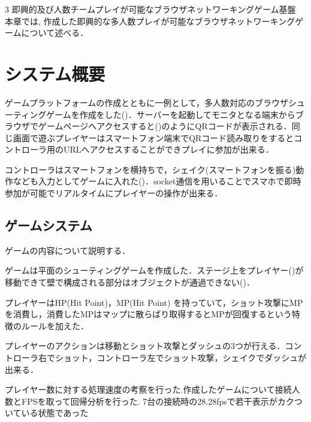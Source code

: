 \chapterhead
{3}
{即興的及び人数チームプレイが可能なブラウザネットワーキングゲーム基盤}
{本章では, 作成した即興的な多人数プレイが可能なブラウザネットワーキングゲームについて述べる．}


\section{システム概要}
ゲームプラットフォームの作成とともに一例として，多人数対応のブラウザシューティングゲームを作成をした()．サーバーを起動してモニタとなる端末からブラウザでゲームページへアクセスすると()のようにQRコードが表示される．同じ画面で遊ぶプレイヤーはスマートフォン端末でQRコード読み取りをするとコントローラ用のURLへアクセスすることができプレイに参加が出来る．

コントローラはスマートフォンを横持ちで，シェイク(スマートフォンを振る)動作なども入力としてゲームに入れた()．socket通信を用いることでスマホで即時参加が可能でリアルタイムにプレイヤーの操作が出来る．


\subsection{ゲームシステム}
ゲームの内容について説明する．

ゲームは平面のシューティングゲームを作成した．ステージ上をプレイヤー()が移動できて壁で構成される部分はオブジェクトが通過できない()．

プレイヤーはHP(Hit Point)，MP(Hit Point) を持っていて，ショット攻撃にMPを消費し，消費したMPはマップに散らばり取得するとMPが回復するという特徴のルールを加えた．

プレイヤーのアクションは移動とショット攻撃とダッシュの3つが行える．コントローラ右でショット，コントローラ左でショット攻撃，シェイクでダッシュが出来る．

プレイヤー数に対する処理速度の考察を行った.作成したゲームについて接続人数とFPSを取って回帰分析を行った.
7台の接続時の28.28fpsで若干表示がカクついている状態であった


